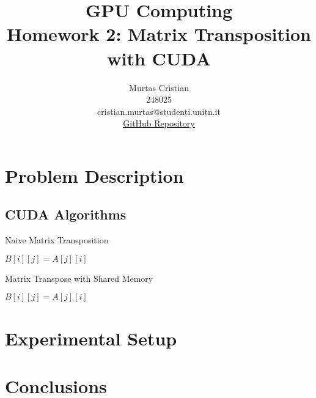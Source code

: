 \documentclass[]{IEEEconf}
\title{\textbf{GPU Computing} \\
    \large Homework 2: Matrix Transposition with CUDA\\
}
\author{Murtas Cristian \\ 248025 \\ cristian.murtas@studenti.unitn.it \\
\underline{\href{https://github.com/SecondarySkyler/gpu-computing/tree/main/matrix_transposition}{GitHub Repository}}
}
\begin{document}
\maketitle
\nocite{*}

\begin{abstract}
    
\end{abstract}
\section{Problem Description}

\subsection{CUDA Algorithms}
\begin{algorithm}
    \caption{Naive Matrix Transposition}
    \begin{algorithmic}[1]
                    \State $B[i][j] = A[j][i]$
                \EndFor
            \EndFor
        \EndProcedure
    \end{algorithmic}
\end{algorithm}
\begin{algorithm}
    \caption{Matrix Transpose with Shared Memory}
    \begin{algorithmic}[1]
                    \State $B[i][j] = A[j][i]$
                \EndFor
            \EndFor
        \EndProcedure
    \end{algorithmic}
\end{algorithm}

\section{Experimental Setup}

\section{Conclusions}



\end{document}
